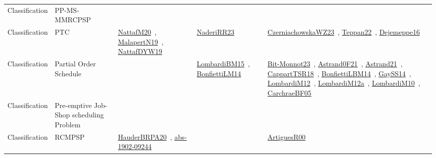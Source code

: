 {\begin{longtable}{lp{3cm}>{\raggedright\arraybackslash}p{6cm}>{\raggedright\arraybackslash}p{6cm}>{\raggedright\arraybackslash}p{8cm}}
Classification & PP-MS-MMRCPSP &  &  & \\
Classification & PTC & \href{../works/NattafM20.pdf}{NattafM20}~\cite{NattafM20}, \href{../works/MalapertN19.pdf}{MalapertN19}~\cite{MalapertN19}, \href{../works/NattafDYW19.pdf}{NattafDYW19}~\cite{NattafDYW19} & \href{../works/NaderiRR23.pdf}{NaderiRR23}~\cite{NaderiRR23} & \href{../works/CzerniachowskaWZ23.pdf}{CzerniachowskaWZ23}~\cite{CzerniachowskaWZ23}, \href{../works/Teppan22.pdf}{Teppan22}~\cite{Teppan22}, \href{../works/Dejemeppe16.pdf}{Dejemeppe16}~\cite{Dejemeppe16}\\
Classification & Partial Order Schedule &  & \href{../works/LombardiBM15.pdf}{LombardiBM15}~\cite{LombardiBM15}, \href{../works/BonfiettiLM14.pdf}{BonfiettiLM14}~\cite{BonfiettiLM14} & \href{../works/Bit-Monnot23.pdf}{Bit-Monnot23}~\cite{Bit-Monnot23}, \href{../works/Astrand0F21.pdf}{Astrand0F21}~\cite{Astrand0F21}, \href{../works/Astrand21.pdf}{Astrand21}~\cite{Astrand21}, \href{../works/CappartTSR18.pdf}{CappartTSR18}~\cite{CappartTSR18}, \href{../works/BonfiettiLBM14.pdf}{BonfiettiLBM14}~\cite{BonfiettiLBM14}, \href{../works/GaySS14.pdf}{GaySS14}~\cite{GaySS14}, \href{../works/LombardiM12.pdf}{LombardiM12}~\cite{LombardiM12}, \href{../works/LombardiM12a.pdf}{LombardiM12a}~\cite{LombardiM12a}, \href{../works/LombardiM10.pdf}{LombardiM10}~\cite{LombardiM10}, \href{../works/CarchraeBF05.pdf}{CarchraeBF05}~\cite{CarchraeBF05}\\
Classification & Pre-emptive Job-Shop scheduling Problem &  &  & \\
Classification & RCMPSP & \href{../works/HauderBRPA20.pdf}{HauderBRPA20}~\cite{HauderBRPA20}, \href{../works/abs-1902-09244.pdf}{abs-1902-09244}~\cite{abs-1902-09244} &  & \href{../works/ArtiguesR00.pdf}{ArtiguesR00}~\cite{ArtiguesR00}\\

\end{longtable}}
